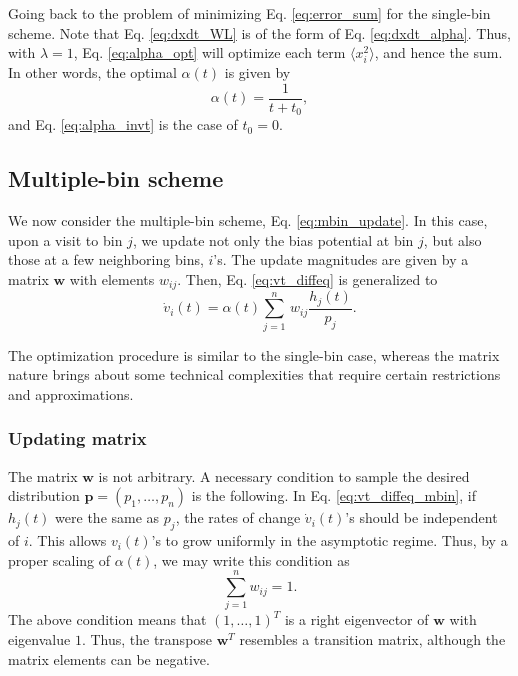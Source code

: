 \documentclass[reprint, floatfix]{revtex4-1}
\begin{document}
Going back to the problem of
minimizing Eq. \eqref{eq:error_sum}
for the single-bin scheme.
%
Note that Eq. \eqref{eq:dxdt_WL}
is of the form of Eq. \eqref{eq:dxdt_alpha}.
%
Thus, with $\lambda = 1$,
Eq. \eqref{eq:alpha_opt}
will optimize each term $\langle x_i^2 \rangle$,
and hence the sum.
%
In other words, the optimal $\alpha(t)$
is given by
\begin{equation}
\alpha(t)
=
\frac{    1     }
     {  t + t_0 }
,
\label{eq:alpha_invt1}
\end{equation}
and Eq. \eqref{eq:alpha_invt}
is the case of $t_0 = 0$.



\subsection{\label{sec:multiple-bin}
Multiple-bin scheme}



We now consider the multiple-bin scheme,
Eq. \eqref{eq:mbin_update}.
%
In this case,
upon a visit to bin $j$,
we update not only the bias potential at bin $j$,
but also those at a few neighboring bins, $i$'s.
%
The update magnitudes are given by a matrix
$\mathbf w$
with elements $w_{ij}$.
%
Then, Eq. \eqref{eq:vt_diffeq} is generalized to
\begin{equation}
  \dot v_i(t)
  =
  \alpha(t) \sum_{j=1}^n \, w_{ij} \frac{ h_j(t) } { p_j }.
  \label{eq:vt_diffeq_mbin}
\end{equation}


The optimization procedure is similar to the single-bin case,
whereas the matrix nature brings about
some technical complexities that require
certain restrictions and approximations.



\subsubsection{\label{sec:updating-matrix}
Updating matrix}



The matrix $\mathbf w$ is not arbitrary.
%
A necessary condition to sample
the desired distribution
$\mathbf p = (p_1, \dots, p_n)$
is the following.
%
In Eq. \eqref{eq:vt_diffeq_mbin},
if $h_j(t)$ were the same as $p_j$,
the rates of change $\dot v_i(t)$'s
should be independent of $i$.
%
This allows $v_i(t)$'s to grow uniformly
in the asymptotic regime.
%
Thus, by a proper scaling of $\alpha(t)$,
we may write this condition as
%
\begin{equation}
  \sum_{j = 1}^n w_{ij} = 1.
  \label{eq:w_sumj}
\end{equation}
%
The above condition means that $(1, \dots, 1)^T$
is a right eigenvector of $\mathbf w$
with eigenvalue $1$.
%
Thus, the transpose $\mathbf w^T$
resembles a transition matrix,
although the matrix elements can be negative.
\end{document}
